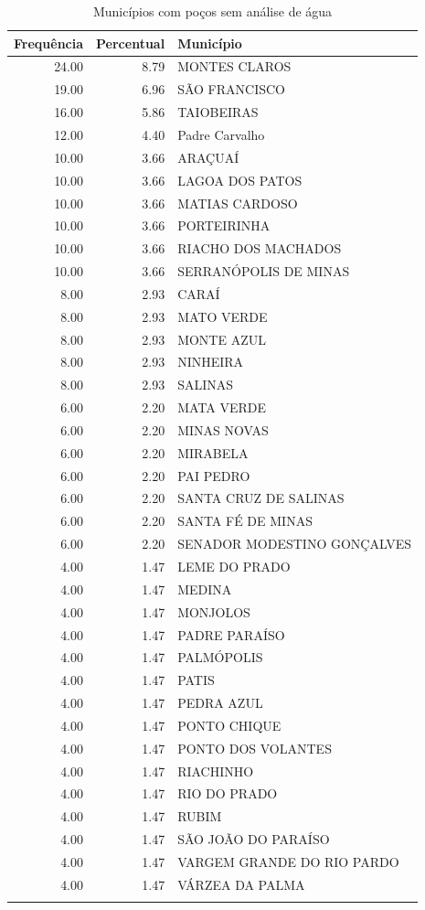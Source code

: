 \documentclass[a4paper, 12pt, openright, oneside, english, brazil, article]{abntex2}
\begin{document}
	\begin{scriptsize}
		\begin{longtable}{rrl}
			\caption{Municípios com poços sem análise de água} \\ 
			\hline
			Frequência & Percentual & Município \\ 
			\hline
			24.00 & 8.79 & MONTES CLAROS \\ 
			19.00 & 6.96 & SÃO FRANCISCO \\ 
			16.00 & 5.86 & TAIOBEIRAS \\ 
			12.00 & 4.40 & Padre Carvalho \\ 
			10.00 & 3.66 & ARAÇUAÍ \\ 
			10.00 & 3.66 & LAGOA DOS PATOS \\ 
			10.00 & 3.66 & MATIAS CARDOSO \\ 
			10.00 & 3.66 & PORTEIRINHA \\ 
			10.00 & 3.66 & RIACHO DOS MACHADOS \\ 
			10.00 & 3.66 & SERRANÓPOLIS DE MINAS \\ 
			8.00 & 2.93 & CARAÍ \\ 
			8.00 & 2.93 & MATO VERDE \\ 
			8.00 & 2.93 & MONTE AZUL \\ 
			8.00 & 2.93 & NINHEIRA \\ 
			8.00 & 2.93 & SALINAS \\ 
			6.00 & 2.20 & MATA VERDE \\ 
			6.00 & 2.20 & MINAS NOVAS \\ 
			6.00 & 2.20 & MIRABELA \\ 
			6.00 & 2.20 & PAI PEDRO \\ 
			6.00 & 2.20 & SANTA CRUZ DE SALINAS \\ 
			6.00 & 2.20 & SANTA FÉ DE MINAS \\ 
			6.00 & 2.20 & SENADOR MODESTINO GONÇALVES \\ 
			4.00 & 1.47 & LEME DO PRADO \\ 
			4.00 & 1.47 & MEDINA \\ 
			4.00 & 1.47 & MONJOLOS \\ 
			4.00 & 1.47 & PADRE PARAÍSO \\ 
			4.00 & 1.47 & PALMÓPOLIS \\ 
			4.00 & 1.47 & PATIS \\ 
			4.00 & 1.47 & PEDRA AZUL \\ 
			4.00 & 1.47 & PONTO CHIQUE \\ 
			4.00 & 1.47 & PONTO DOS VOLANTES \\ 
			4.00 & 1.47 & RIACHINHO \\ 
			4.00 & 1.47 & RIO DO PRADO \\ 
			4.00 & 1.47 & RUBIM \\ 
			4.00 & 1.47 & SÃO JOÃO DO PARAÍSO \\ 
			4.00 & 1.47 & VARGEM GRANDE DO RIO PARDO \\ 
			4.00 & 1.47 & VÁRZEA DA PALMA \\ 
			\hline
			\hline
			\label{motivo1}
		\end{longtable}
	\end{scriptsize}
	
\end{document}

